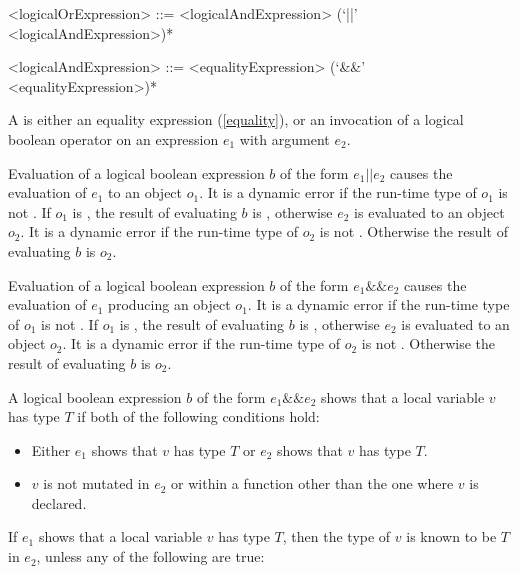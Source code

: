 \documentclass[makeidx]{article}
\begin{document}
{\begin{grammar}
<logicalOrExpression> ::= \gnewline{}
  <logicalAndExpression> (`||' <logicalAndExpression>)*

<logicalAndExpression> ::= <equalityExpression> (`\&\&' <equalityExpression>)*
\end{grammar}

\LMHash{}%
A  is either an equality expression
(\ref{equality}),
or an invocation of a logical boolean operator on
an expression $e_1$ with argument $e_2$.

\LMHash{}%
Evaluation of a logical boolean expression $b$ of the form $e_1 || e_2$ causes
the evaluation of $e_1$ to an object $o_1$.
It is a dynamic error if the run-time type of $o_1$ is not .
If $o_1$ is \TRUE, the result of evaluating $b$ is \TRUE,
otherwise $e_2$ is evaluated to an object $o_2$.
It is a dynamic error if the run-time type of $o_2$ is not .
Otherwise the result of evaluating $b$ is $o_2$.

\LMHash{}%
Evaluation of a logical boolean expression $b$ of the form $e_1 \&\& e_2$
causes the evaluation of $e_1$ producing an object $o_1$.
It is a dynamic error if the run-time type of $o_1$ is not .
If $o_1$ is \FALSE, the result of evaluating $b$ is \FALSE,
otherwise $e_2$ is evaluated to an object $o_2$.
It is a dynamic error if the run-time type of $o_2$ is not .
Otherwise the result of evaluating $b$ is $o_2$.

\LMHash{}%
A logical boolean expression $b$ of the form $e_1 \&\& e_2$
shows that a local variable $v$ has type $T$
if both of the following conditions hold:

\begin{itemize}
\item Either $e_1$ shows that $v$ has type $T$
  or $e_2$ shows that $v$ has type $T$.
\item $v$ is not mutated in $e_2$ or within a function
  other than the one where $v$ is declared.
\end{itemize}

\LMHash{}%
If $e_1$ shows that a local variable $v$ has type $T$,
then the type of $v$ is known to be $T$ in $e_2$,
unless any of the following are true:

}
\end{document}
